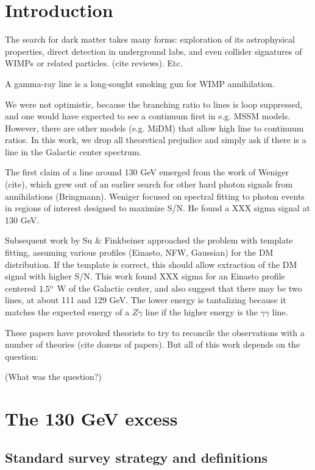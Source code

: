 \documentclass[aps,twocolumn,prd,superscriptaddress,showpacs,nofootinbib,fixfloat]{revtex4}
\newcommand{\degree}{^{\rm o}}
\begin{document}
\section{Introduction}
The search for dark matter takes many forms:  exploration of its astrophysical
properties, direct detection in underground labs, and even collider signatures
of WIMPs or related particles.  (cite reviews).   Etc. 

A gamma-ray line is a long-sought smoking gun for WIMP annihilation. 

We were not optimistic, because the branching ratio to lines is loop
suppressed, and one would have expected to see a continuum first in e.g. MSSM
models.  However, there are other models (e.g. MiDM) that allow high line to
continuum ratios.  In this work, we drop all theoretical prejudice and simply
ask if there is a line in the Galactic center spectrum. 

The first claim of a line around 130 GeV emerged from the work of Weniger
(cite), which grew out of an earlier search for other hard photon signals from
annihilations (Bringmann).  Weniger focused on spectral fitting to photon
events in regions of interest designed to maximize S/N.  He found a XXX sigma
signal at 130 GeV. 

Subsequent work by Su \& Finkbeiner approached the problem with template
fitting, assuming various profiles (Einasto, NFW, Gaussian) for the DM
distribution.  If the template is correct, this should allow extraction of the
DM signal with higher S/N.   This work found XXX sigma for an Einasto profile
centered $1.5\degree$ W of the Galactic center, and also suggest that there
may be two lines, at about 111 and 129 GeV.  The lower energy is tantalizing
because it matches the expected energy of a $Z\gamma$ line if the higher
energy is the $\gamma\gamma$ line. 

These papers have provoked theorists to try to reconcile the observations with
a number of theories (cite dozens of papers).  But all of this work depends on
the question:

(What was the question?)


\section{The 130 GeV excess}

\subsection{Standard survey strategy and definitions}
\end{document}
